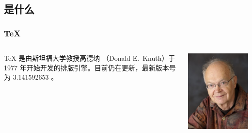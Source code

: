 \begin{shadedsection}

\section{是什么}
\begin{frame}
  \frametitle{\TeX{}}
  \begin{columns}[c]
    \begin{column}{0.7\textwidth}
      \begin{center}
        \rmfamily\Huge
        \highlight[structure!70]{\TeX{}}
      \end{center}
      \begin{center}
        \parbox{0.75\textwidth}{
          \TeX{} 是由斯坦福大学教授高德纳
          （Donald E.~Knuth）于 1977 年开始开发的排版引擎。目前仍在更新，最新版本号为 3.141592653 。
        }
      \end{center}
    \end{column}
    \begin{column}{0.3\textwidth}
      \includegraphics[width=.8\columnwidth]{support/images/Knuth.jpg}
    \end{column}
  \end{columns}
\end{frame}


\end{shadedsection}
